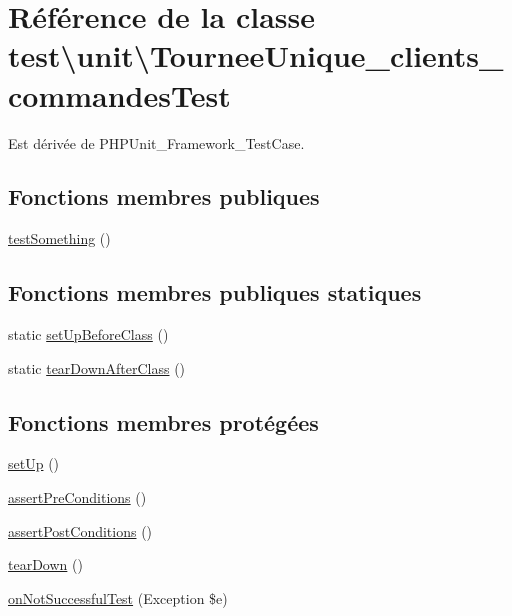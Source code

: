 \hypertarget{classtest_1_1unit_1_1TourneeUnique__clients__commandesTest}{}\section{Référence de la classe test\textbackslash{}unit\textbackslash{}Tournee\+Unique\+\_\+clients\+\_\+commandes\+Test}
\label{classtest_1_1unit_1_1TourneeUnique__clients__commandesTest}


Est dérivée de P\+H\+P\+Unit\+\_\+\+Framework\+\_\+\+Test\+Case.

\subsection*{Fonctions membres publiques}
\begin{DoxyCompactItemize}
\item 
\hyperlink{classtest_1_1unit_1_1TourneeUnique__clients__commandesTest_a9a657c8a9523f1a06d7bac1a5415ab63}{test\+Something} ()
\end{DoxyCompactItemize}
\subsection*{Fonctions membres publiques statiques}
\begin{DoxyCompactItemize}
\item 
static \hyperlink{classtest_1_1unit_1_1TourneeUnique__clients__commandesTest_aaae8cd0fb2cba2d962c24d77f635ed80}{set\+Up\+Before\+Class} ()
\item 
static \hyperlink{classtest_1_1unit_1_1TourneeUnique__clients__commandesTest_a7e98a466b53df77197f3ad67b8c58191}{tear\+Down\+After\+Class} ()
\end{DoxyCompactItemize}
\subsection*{Fonctions membres protégées}
\begin{DoxyCompactItemize}
\item 
\hyperlink{classtest_1_1unit_1_1TourneeUnique__clients__commandesTest_a7d7b3e3d6ef48be3791207a98b33d3cb}{set\+Up} ()
\item 
\hyperlink{classtest_1_1unit_1_1TourneeUnique__clients__commandesTest_a0130c4e31f52bba1128b114446aa58ff}{assert\+Pre\+Conditions} ()
\item 
\hyperlink{classtest_1_1unit_1_1TourneeUnique__clients__commandesTest_af8031c65a8987e63720d6952559a66c6}{assert\+Post\+Conditions} ()
\item 
\hyperlink{classtest_1_1unit_1_1TourneeUnique__clients__commandesTest_af3d6427bc18618f2cc537e9ac1a2c88c}{tear\+Down} ()
\item 
\hyperlink{classtest_1_1unit_1_1TourneeUnique__clients__commandesTest_a461c713c702cc3b8df75d63bbb898048}{on\+Not\+Successful\+Test} (Exception \$e)
\end{DoxyCompactItemize}


